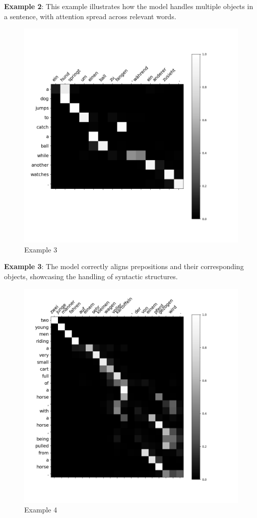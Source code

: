 \documentclass{article}
\begin{document}
\textbf{Example 2}: This example illustrates how the model handles multiple objects in a sentence, with attention spread across relevant words.

\begin{figure}[H]
    \centering
    \includegraphics[width=0.8\linewidth]{281_translation.png}
    \caption{Example 3}
\end{figure}


\textbf{Example 3}: The model correctly aligns prepositions and their corresponding objects, showcasing the handling of syntactic structures.

\begin{figure}[H]
    \centering
    \includegraphics[width=0.8\linewidth]{654_translation.png}
    \caption{Example 4}
\end{figure}
\end{document}
